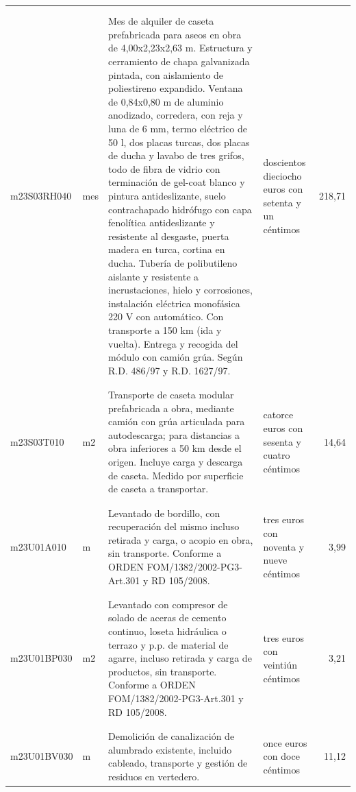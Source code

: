 \begin{supertabular}{|l|l|p{5cm}|p{3cm}|r|}
&&&&\\%
&&&&\\%
m23S03RH040&mes&Mes de alquiler de caseta prefabricada para aseos en obra de 4,00x2,23x2,63 m. Estructura y cerramiento de chapa galvanizada pintada, con aislamiento de poliestireno expandido. Ventana de 0,84x0,80 m de aluminio anodizado, corredera, con reja y luna de 6 mm, termo eléctrico de 50 l, dos placas turcas, dos placas de ducha y lavabo de tres grifos, todo de fibra de vidrio con terminación de gel{-}coat blanco y pintura antideslizante, suelo contrachapado hidrófugo con capa fenolítica antideslizante y resistente al desgaste, puerta madera en turca, cortina en ducha. Tubería de polibutileno aislante y resistente a incrustaciones, hielo y corrosiones, instalación eléctrica monofásica 220 V con automático. Con transporte a 150 km (ida y vuelta). Entrega y recogida del módulo con camión grúa. Según R.D. 486/97 y R.D. 1627/97.&doscientos dieciocho euros con setenta y un céntimos&218,71\\%
&&&&\\%
&&&&\\%
m23S03T010&m2&Transporte de caseta modular prefabricada a obra, mediante camión con grúa articulada para autodescarga; para distancias a obra inferiores a 50 km desde el origen. Incluye carga y descarga de caseta. Medido por superficie de caseta a transportar.&catorce euros con sesenta y cuatro céntimos&14,64\\%
&&&&\\%
&&&&\\%
m23U01A010&m&Levantado de bordillo, con recuperación del mismo incluso retirada y carga, o acopio en obra, sin transporte. Conforme a ORDEN FOM/1382/2002{-}PG3{-}Art.301 y RD 105/2008.&tres euros con noventa y nueve céntimos&3,99\\%
&&&&\\%
&&&&\\%
m23U01BP030&m2&Levantado con compresor de solado de aceras de cemento continuo, loseta hidráulica o terrazo y p.p. de material de agarre, incluso retirada y carga de productos, sin transporte. Conforme a ORDEN FOM/1382/2002{-}PG3{-}Art.301 y RD 105/2008.&tres euros con veintiún céntimos&3,21\\%
&&&&\\%
&&&&\\%
m23U01BV030&m&Demolición de canalización de alumbrado existente, incluido cableado, transporte y gestión de residuos en vertedero.&once euros con doce céntimos&11,12\\%

\end{supertabular}
